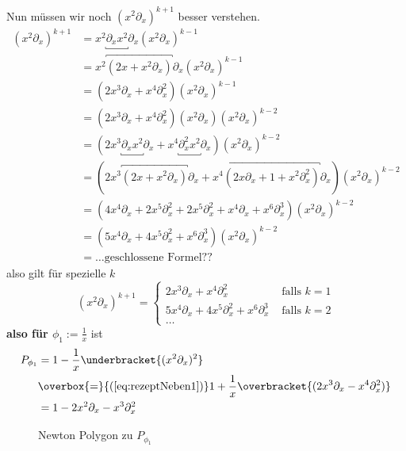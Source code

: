 Nun müssen wir noch $(x^2\partial_x)^{k+1}$ besser verstehen.
\begin{align*}
(x^2\partial_x)^{k+1} &=x^2\underbracket{\partial_xx^2}\partial_x
                        (x^2\partial_x)^{k-1}\\
                      &=x^2\overbracket{(2x+x^{2}\partial_x)}\partial_x
                        (x^2\partial_x)^{k-1}\\
                      &=(2x^3\partial_x+x^{4}\partial_x^2)
                        (x^2\partial_x)^{k-1}\\
                      &=(2x^3\partial_x+x^{4}\partial_x^2)(x^2\partial_x)
                        (x^2\partial_x)^{k-2}\\
                      &=(2x^3\underbracket{\partial_xx^2}\partial_x
                        +x^{4}\underbracket{\partial_x^2x^2}\partial_x)
                        (x^2\partial_x)^{k-2}\\
                      &=(2x^3\overbracket{(2x+x^{2}\partial_x)}\partial_x
                        +x^{4}\overbracket{(2x\partial_x+1+x^2\partial_x^2)}
                        \partial_x) (x^2\partial_x)^{k-2}\\
                      &=(4x^4\partial_x+2x^{5}\partial_x^2
                        +2x^{5}\partial_x^2
                        +x^4\partial_x
                        +x^6\partial_x^3)
                        (x^2\partial_x)^{k-2}\\
                      &=(5x^4\partial_x+4x^{5}\partial_x^2
                        +x^6\partial_x^3)
                        (x^2\partial_x)^{k-2}\\
                      &=\dots \mbox{geschlossene Formel??}
\end{align*}
also gilt für spezielle $k$
\begin{equation} \label{eq:rezeptNeben1}
(x^2\partial_x)^{k+1}=
\begin{cases}
2x^3\partial_x+x^{4}\partial_x^2 & \mbox{ falls } k=1\\
5x^4\partial_x+4x^{5}\partial_x^2 +x^6\partial_x^3 & \mbox{ falls } k=2\\
\dots
\end{cases}
\end{equation}
\textbf{also für $\phi_1:=\frac{1}{x}$} ist
\begin{align*}
P_{\phi_1} &=1-\frac{1}{x}\underbracket{(x^2\partial_x)^{2}}\\
           &\overbox{=}{(\ref{eq:rezeptNeben1})}1+\frac{1}{x}
             \overbracket{(2x^3\partial_x-x^4\partial_x^2)}\\
           &=1-2x^2\partial_x-x^{3}\partial_x^2
\end{align*}
\begin{figure}[H]
\caption{Newton Polygon zu $P_{\phi_1}$}
\begin{center}
\end{center}
\end{figure}

